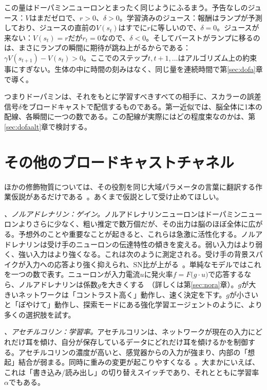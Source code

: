 この量はドーパミンニューロンとまったく同じようにふるまう。予告なしのジュース：$V$はまだゼロで、$r>0$、$\delta>0$。学習済みのジュース：報酬はランプが予測しており、ジュースの直前の$V(s_t)$はすでに$r$に等しいので、$\delta=0$。ジュースが来ない：$V(s_t)=r$だが$r_t=0$なので、$\delta<0$。そしてバーストがランプに移るのは、まさにランプの瞬間に期待が跳ね上がるからである：$\gamma V(s_{t+1})-V(s_t)>0$。ここでのステップ$t,t+1,\dots$はアルゴリズム上の約束事にすぎない。生体の中に時間の刻みはなく、同じ量を連続時間で第\ref{sec:dofa}章で導く。

つまりドーパミンは、それをもとに学習すべきすべての相手に、スカラーの誤差信号$\delta$をブロードキャストで配信するものである。第一近似では、脳全体に1本の配線、各瞬間に一つの数である。この配線が実際にはどの程度束なのかは、第\ref{sec:dofaalt}章で検討する。

\section{その他のブロードキャストチャネル}

ほかの修飾物質については、その役割を同じ大域パラメータの言葉に翻訳する作業仮説があるだけである~\cite{Doya2002}。あくまで仮説として受け止めてほしい。

\emph{、ノルアドレナリン：ゲイン。}ノルアドレナリンニューロンはドーパミンニューロンよりさらに少なく、粗い推定で数万個だが、その出力は脳のほぼ全体に広がる。予想外のことや重要なことが起きると、これらは急激に活性化する。ノルアドレナリンは受け手のニューロンの伝達特性の傾きを変える。弱い入力はより弱く、強い入力はより強くなる。これは次のように測定される。受け手の背景スパイクが入力への応答より強く抑えられ、SN比が上がる~\cite{Foote1975NE}。単純なモデルではこれを一つの数で表す。ニューロンが入力電流$u$に発火率$f=F\bigl(g\cdot u\bigr)$で応答するなら、ノルアドレナリンは係数$g$を大きくする~\cite{AstonJones2005}（詳しくは第\ref{sec:nora}章）。$g$が大きいネットワークは「コントラスト高く」動作し、速く決定を下す。$g$が小さいと「ぼやけて」動作し、探索モードにある強化学習エージェントのように、より多くの選択肢を試す。

\emph{、アセチルコリン：学習率。}アセチルコリンは、ネットワークが現在の入力にどれだけ耳を傾け、自分が保存しているデータにどれだけ耳を傾けるかを制御する。アセチルコリンの濃度が高いと、感覚器からの入力が強まり、内部の「想起」結合が弱まる。同時に重みの変更が起こりやすくなる~\cite{Hasselmo2006}。大まかにいえば、これは「書き込み/読み出し」の切り替えスイッチであり、それとともに学習率$\alpha$でもある。

